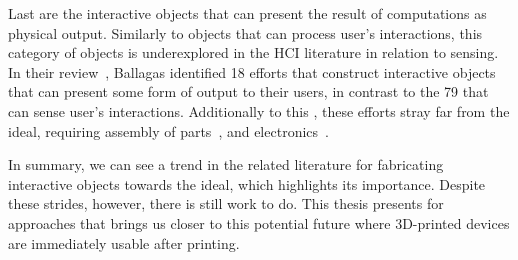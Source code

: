     Last are the interactive objects that can present the result of computations
    as physical output. Similarly to objects that can process user's
    interactions, this category of objects is underexplored in the HCI
    literature in relation to sensing. In their review~\cite{Ballagas:2018},
    Ballagas \etal identified 18 efforts that construct interactive objects that
    can present some form of output to their users, in contrast to the 79 that
    can sense user's interactions. Additionally to this ,
    these efforts stray far from the \papf ideal, requiring assembly of
    parts~\cite{}, and electronics~\cite{}.

    In summary, we can see a trend in the related literature for fabricating
    interactive objects towards the \papf ideal, which highlights its
    importance. Despite these strides, however, there is still work to do. This
    thesis presents for approaches that brings us closer to this potential
    future where 3D-printed devices are immediately usable after printing.